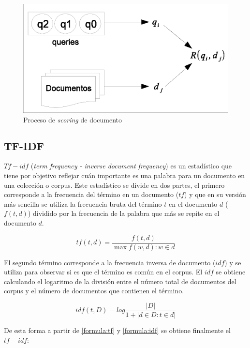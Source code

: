 \begin{figure}[!th]
\centering
\includegraphics[scale=.75]{images/ranking_process.eps}
\caption{Proceso de \textit{scoring} de documento}
\label{fig:ranking_process}
\end{figure}


\subsection{TF-IDF}
\label{marco:tfi-df}
$Tf-idf$ (\textit{term frequency - inverse document frequency}) es un estadístico que tiene por objetivo reflejar cuán importante es una palabra para un documento en una colección o corpus. Este estadístico se divide en dos partes, el primero corresponde a la frecuencia del término en un documento ($tf$) y que en su versión más sencilla se utiliza la frecuencia bruta del término $t$ en el documento $d$ ($f(t,d)$) dividido por la frecuencia de la palabra que más se repite en el documento $d$.  

\begin{equation}
\label{formula:tf}
tf(t,d) = \dfrac{f(t,d) }{ \max{f(w,d) : w \in d}}
\end{equation}

El segundo término corresponde a la frecuencia inversa de documento ($idf$) y se utiliza para observar si es que el término es común en el corpus. El $idf$ se obtiene calculando el logaritmo de la división entre el número total de documentos del corpus y el número de documentos que contienen el término.

\begin{equation}
\label{formula:idf}
idf(t,D) = log \frac{ |D| }{1 + |{d \in D : t \in d}|}
\end{equation}

De esta forma a partir de \eqref{formula:tf} y \eqref{formula:idf} se obtiene finalmente el $tf-idf$: 

